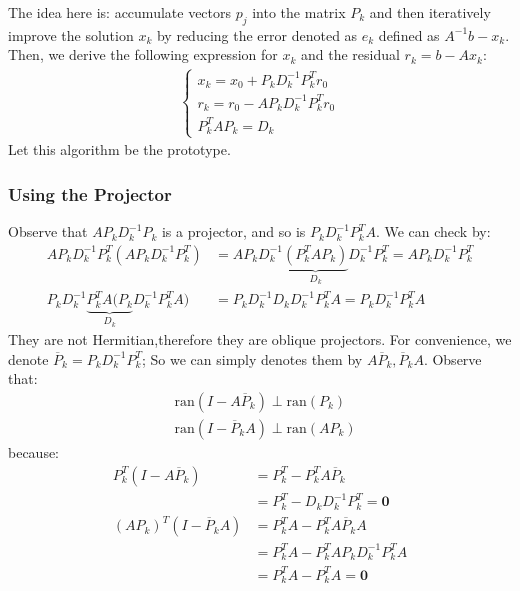\documentclass[]{article}
\theoremstyle{definition}
\begin{document}
            The idea here is: accumulate vectors $p_j$ into the matrix $P_k$ and then iteratively improve the solution $x_k$ by reducing the error denoted as $e_k$ defined as $A^{-1}b - x_k$. Then, we derive the following expression for $x_k$ and the residual $r_k = b - Ax_k$: 
            \begin{align}
                \begin{cases}
                    x_k = x_0 + P_kD^{-1}_kP^T_kr_0
                    \\
                    r_k = r_0 - AP_kD^{-1}_kP^T_k r_0
                    \\
                    P^T_kAP_k = D_k
                \end{cases}
            \end{align}
            Let this algorithm be the prototype. 
        \subsubsection{Using the Projector}
            Observe that $AP_kD_k^{-1}P_k$ is a projector, and so is $P_kD^{-1}_kP_k^TA$. We can check by: 
            \begin{align}
                AP_kD^{-1}_kP_k^T(AP_kD^{-1}_kP_k^T) 
                &= 
                AP_kD^{-1}_k
                    \underbrace{(P_k^TAP_k)}_{D_k}
                D^{-1}_kP_k^T  = AP_kD_k^{-1}P_k^T 
                \\
                P_kD^{-1}_k
                \underbrace{P_k^{T}A(P_k}_{D_k}
                D^{-1}_kP_k^{T}
                A) &= P_kD^{-1}_kD_kD_{k}^{-1}P^T_kA
                = P_kD^{-1}_kP^T_kA
            \end{align}
            \noindent
            They are not Hermitian,therefore they are oblique projectors. For convenience, we denote $\overline{P}_k = P_kD_k^{-1}P_k^{T}$; So we can simply denotes them by $A\overline{P}_k, \overline{P}_kA$. Observe that: 
            \begin{align}
                & \text{ran}(I - A\overline{P}_k )\perp \text{ran}(P_k)
                \\
                & \text{ran}(I - \overline{P}_kA) \perp \text{ran}(AP_k)
            \end{align}
            because:
            \begin{align}
                P_k^T(I - A\overline{P}_k) &= P_k^T - P_k^{T}A\overline{P}_k
                \\
                &= P_k^{T} - D_kD_k^{-1}P^T_k = \mathbf{0}
                \\
                (AP_k)^T(I - \overline{P}_kA) &=P_k^TA - P_k^TA\overline{P}_kA
                \\
                &= P_k^TA - P_k^TAP_kD_k^{-1}P_k^TA
                \\
                &= P_k^TA - P^T_kA = \mathbf{0}
            \end{align}
            
\end{document}

